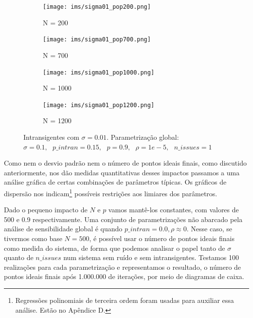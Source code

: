   \begin{figure}[H]
    \centering
    \begin{subfigure}[b]{0.49\textwidth}
      \texttt{[image: ims/sigma01\_pop200.png]}
      \caption{N = 200}
    \end{subfigure}
    \begin{subfigure}[b]{0.49\textwidth}
      \texttt{[image: ims/sigma01\_pop700.png]}
       \caption{N = 700}
     \end{subfigure}

         \begin{subfigure}[b]{0.49\textwidth}
      \texttt{[image: ims/sigma01\_pop1000.png]}
       \caption{N = 1000}
     \end{subfigure}
         \begin{subfigure}[b]{0.49\textwidth}
      \texttt{[image: ims/sigma01\_pop1200.png]}
       \caption{N = 1200}
     \end{subfigure}

     \caption{ Intransigentes com \(\sigma = 0.01\). Parametrização global: \( \sigma =
       0.1, \text{ } p\_intran = 0.15, \text{ } p = 0.9,
       \text{ } \rho = 1e-5, \text{ } n\_issues = 1 \)}
    \label{fig:newintrans2}
     \end{figure}
  

  
    Como nem o desvio padrão nem o número de pontos ideais finais,
    como discutido anteriormente, nos dão medidas quantitativas desses impactos
    passamos a uma análise gráfica de certas combinações de parâmetros típicas.
    Os gráficos de dispersão nos indicam\footnote{Regressões polinomiais de
      terceira ordem foram usadas para auxiliar essa análise. Estão no
      Apêndice D.} possíveis restrições aos limiares dos parâmetros.

    Dado o pequeno impacto de \(N\) e \(p\) vamos mantê-los constantes, com
    valores de 500 e 0.9 respectivamente. Uma conjunto de parametrizações não
    abarcado pela análise de sensibilidade global é quando \(p\_intran = 0.0, \rho \approx
    0 \). Nesse caso, se tivermos como base \(N = 500\), é possível usar o
    número de pontos ideais finais como medida do sistema, de forma que podemos
    analisar o papel tanto de \(\sigma\) quanto de \(n\_issues\) num sistema sem
    ruído e sem intransigentes. Testamos 100 realizações para cada
    parametrização e representamos o resultado, o número de pontos ideais finais
    após 1.000.000 de iterações, por meio de diagramas de caixa.
    
